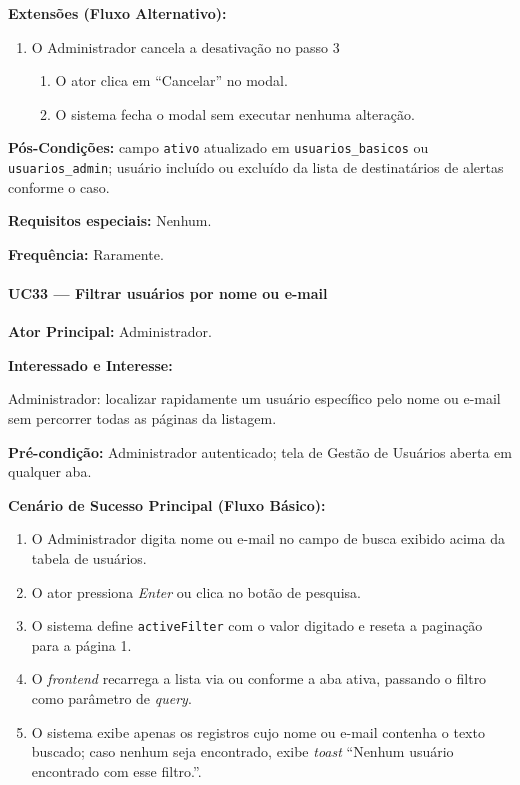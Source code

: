 \textbf{Extensões (Fluxo Alternativo):}

\begin{enumerate}
  \renewcommand{\theenumi}{3a}
  \renewcommand{\labelenumi}{\theenumi.}
  \item O Administrador cancela a desativação no passo 3
  \begin{enumerate}
  \item O ator clica em ``Cancelar'' no modal.
  \item O sistema fecha o modal sem executar nenhuma
        alteração.
  \end{enumerate}
\end{enumerate}

\textbf{Pós-Condições:} campo \texttt{ativo} atualizado
em \texttt{usuarios\_basicos} ou \\ \texttt{usuarios\_admin};
usuário incluído ou excluído da lista de destinatários
de alertas conforme o caso.

\textbf{Requisitos especiais:} Nenhum.

\textbf{Frequência:} Raramente.

\paragraph{UC33 --- Filtrar usuários por nome ou e-mail}\hfill\break

\textbf{Ator Principal:} Administrador.

\textbf{Interessado e Interesse:}

Administrador: localizar rapidamente um usuário específico
pelo nome ou e-mail sem percorrer todas as páginas da
listagem.

\textbf{Pré-condição:} Administrador autenticado; tela de
Gestão de Usuários aberta em qualquer aba.

\textbf{Cenário de Sucesso Principal (Fluxo Básico):}
\begin{enumerate}
  \item O Administrador digita nome ou e-mail no campo de
        busca exibido acima da tabela de usuários.
  \item O ator pressiona \textit{Enter} ou clica no botão
        de pesquisa.
  \item O sistema define \texttt{activeFilter} com o
        valor digitado e reseta a paginação para a
        página 1.
  \item O \textit{frontend} recarrega a lista via
        ou 
        conforme a aba ativa, passando o filtro como
        parâmetro de \textit{query}.
  \item O sistema exibe apenas os registros cujo nome
        ou e-mail contenha o texto buscado; caso nenhum
        seja encontrado, exibe \textit{toast}
        ``Nenhum usuário encontrado com esse filtro.''.
\end{enumerate}

